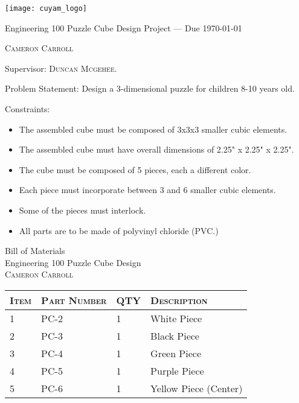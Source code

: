 \documentclass[11pt,letterpaper]{article}
\begin{document}
\thispagestyle{empty}
\begin{spacing}{1.5}
\begin{center}

\texttt{[image: cuyam\_logo]}

\vspace*{15mm}
{\large Engineering 100 Puzzle Cube Design Project --- Due \today
}

\vspace*{10mm}

{\large \textsc{ Cameron Carroll}
}

\vspace*{10mm}

\small{Supervisor: \textsc{Duncan Mcgehee.}}

\vspace{15mm}
{\large Problem Statement:
}
Design a 3-dimensional puzzle for children 8-10 years old.
\vspace*{20mm}

{\large Constraints:
}
\
\begin{itemize}
\item The assembled cube must be composed of 3x3x3 smaller cubic elements.
\item The assembled cube must have overall dimensions of 2.25" x 2.25" x 2.25".
\item The cube must be composed of 5 pieces, each a different color.
\item Each piece must incorporate between 3 and 6 smaller cubic elements.
\item Some of the pieces must interlock.
\item All parts are to be made of polyvinyl chloride (PVC.)
\end{itemize}

\end{center}
\end{spacing}

\newpage
\setcounter{page}{1}

\begin{center}
{\LARGE Bill of Materials \\
}
{\large Engineering 100 Puzzle Cube Design \\
\textsc{Cameron Carroll}
}
\vspace{30mm}

\begin{tabularx}{\textwidth}{ | X| X| X| X|}
\hline
\textsc{Item} & \textsc{Part Number} & \textsc{QTY} & \textsc{Description} \\
\hline
1 & PC-2 & 1 & White Piece \\
2 & PC-3 & 1 & Black Piece \\
3 & PC-4 & 1 & Green Piece \\
4 & PC-5 & 1 & Purple Piece \\
5 & PC-6 & 1 & Yellow Piece (Center) \\
\hline

\end{tabularx}


\end{center}
\end{document}

